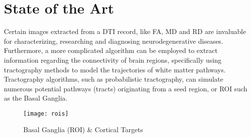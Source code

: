 \section{State of the Art}

Certain images extracted from a \ac{DTI} record, like \ac{FA}, \ac{MD} and \ac{RD} are invaluable for characterizing, researching and diagnosing neurodegenerative diseases. Furthermore, a more complicated algorithm can be employed to extract information regarding the connectivity of brain regions, specifically using tractography methods to model the trajectories of white matter pathways. Tractography algorithms, such as probabilistic tractography, can simulate numerous potential pathways (tracts) originating from a seed region, or \ac{ROI} such as the Basal Ganglia.
\begin{figure}[H]
\centering
\texttt{[image: rois]}
\caption{Basal Ganglia (ROI) \& Cortical Targets}
\label{fig:rois}
\end{figure}
